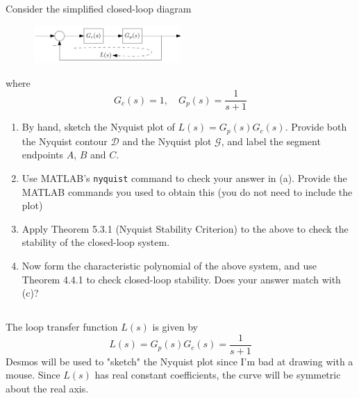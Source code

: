 \section{}
Consider the simplified closed-loop diagram
\begin{figure}[h]
    \centering
    \includegraphics[width=0.5\textwidth]{Questions/Figures/Q1ProblemDiagram.png}
\end{figure}
where
\begin{equation*}
    G_c(s) = 1, \quad G_p(s) = \frac{1}{s+1}
\end{equation*}
\begin{enumerate}[label=(\alph*)]
    \item By hand, sketch the Nyquist plot of $L(s) = G_p(s)G_c(s)$. Provide both the Nyquist contour $\mathcal{D}$ and the Nyquist plot $\mathcal{G}$, 
    and label the segment endpoints $A$, $B$ and $C$.
    \item Use MATLAB's \texttt{nyquist} command to check your answer in (a). Provide the MATLAB commands you used to obtain this (you do not need to include the plot)
    \item Apply Theorem 5.3.1 (Nyquist Stability Criterion) to the above to check the stability of the closed-loop system.
    \item Now form the characteristic polynomial of the above system, and use Theorem 4.4.1 to check closed-loop stability. Does your answer match with (c)?
\end{enumerate}

\subsection{}
The loop transfer function $L(s)$ is given by
\begin{equation*}
    L(s) = G_p(s)G_c(s) = \frac{1}{s+1}
\end{equation*}
Desmos will be used to "sketch" the Nyquist plot since I'm bad at drawing with a mouse. Since $L(s)$ has real 
constant coefficients, the curve will be symmetric about the real axis. 

